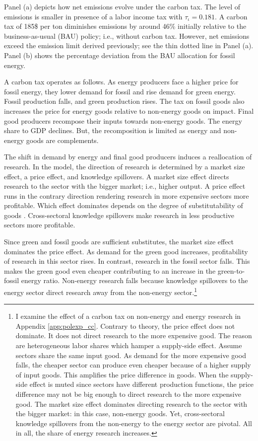 Panel (a) depicts how net emissions evolve under the carbon tax. The level of emissions is smaller in presence of a labor income tax with $\tau_{\iota}=0.181$.   A carbon tax of 185\$ per ton diminishes emissions by around 46\% initially relative to the business-as-usual (BAU) policy; i.e., without carbon tax. However, net emissions exceed the emission limit  derived previously; see the thin dotted line in Panel (a). Panel (b) shows the percentage deviation from the BAU allocation for fossil energy.

A carbon tax operates as follows. As energy producers face a higher price for fossil energy, they lower demand for fossil and rise demand for green energy. Fossil production falls, and green production rises.
The tax on fossil goods also increases the price for energy goods relative to non-energy goods on impact. Final good producers recompose their inputs towards non-energy goods. The energy share to GDP declines.  But, the recomposition is limited as energy and non-energy goods are complements. 

The shift in demand by energy and final good producers induces a reallocation of research. In the model, the direction of research is determined by a market size effect, a price effect, and knowledge spillovers. 
A market size effect directs research to the sector with the bigger market; i.e., higher output. A price effect runs in the contrary direction rendering research in more expensive sectors more profitable. Which effect dominates depends on the degree of substitutability of goods \citep{Acemoglu2002DirectedChange, Hemous2021DirectedEconomics}. Cross-sectoral knowledge spillovers make research in less productive sectors more profitable.

Since green and fossil goods are sufficient substitutes, the market size effect dominates the price effect. As demand for the green good increases, profitability of research in  this sector rises. In contrast, research in the fossil sector falls. This makes the green good even cheaper contributing to an increase in the green-to-fossil energy ratio.
Non-energy research falls because knowledge spillovers to the energy sector direct research away from the non-energy sector.\footnote{ I examine the effect of a carbon tax on non-energy and energy research in Appendix \ref{app:polexp_cc}. Contrary to theory, the price effect does not dominate. It does not direct research to the more expensive good. The reason are heterogeneous labor shares which hamper a supply-side effect. Assume sectors share the same input good. As demand for the more expensive good falls, the cheaper sector can produce even cheaper because of a higher supply of input goods. This amplifies the price difference in goods. When the supply-side effect is muted since sectors have different production functions, the price difference may not be big enough to direct research to the more expensive good. The market size effect dominates directing research to the sector with the bigger market: in this case, non-energy goods. Yet, cross-sectoral knowledge spillovers from the non-energy to the energy sector are pivotal. All in all, the share of energy research increases.}


